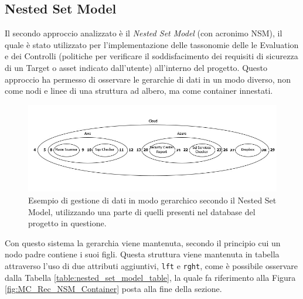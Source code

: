 \subsection{Nested Set Model}
Il secondo approccio analizzato è il \textit{Nested Set Model} (con acronimo NSM), il quale è stato utilizzato per l'implementazione delle tassonomie 
delle le Evaluation e dei Controlli (politiche per verificare il soddisfacimento dei requisiti di sicurezza di un Target o asset indicato dall'utente) 
all'interno del progetto.\hfill\break
Questo approccio ha permesso di osservare le gerarchie di dati in un modo diverso, non come nodi e linee di una struttura ad albero, ma 
come container innestati.
%
\begin{figure}[ht!]
    \centering
    \includegraphics[scale=0.68]{images/MC_Rec_NSM_Container(R).jpg}
    \caption[Gestione di dati, come container innestati, secondo il NSM]{Esempio di gestione di dati in modo gerarchico secondo il Nested Set Model, utilizzando una parte di quelli presenti nel database del 
    progetto in questione.}
    \label{fig:MC_Rec_NSM_Container_R}
\end{figure}
\hfill\break
%
Con questo sistema la gerarchia viene mantenuta, secondo il principio cui un nodo padre contiene i suoi figli. Questa struttura 
viene mantenuta in tabella attraverso l'uso di due attributi aggiuntivi, \texttt{lft} e \texttt{rght}, come è possibile osservare 
dalla Tabella \ref{table:nested_set_model_table}, la quale fa riferimento alla Figura \ref{fig:MC_Rec_NSM_Container} 
posta alla fine della sezione.
%
\newpage
%
